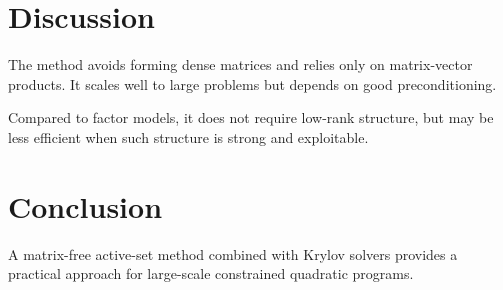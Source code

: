 \documentclass[11pt]{article}
\begin{document}
\section{Discussion}

The method avoids forming dense matrices and relies only on matrix-vector products. It scales well to large problems but depends on good preconditioning.

Compared to factor models, it does not require low-rank structure, but may be less efficient when such structure is strong and exploitable.

\section{Conclusion}

A matrix-free active-set method combined with Krylov solvers provides a practical approach for large-scale constrained quadratic programs.
\end{document}

